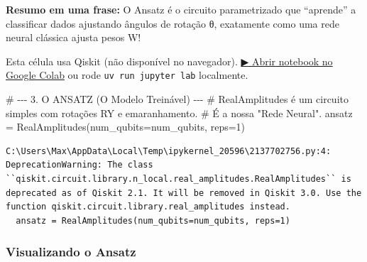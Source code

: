 \documentclass[
  brazilian,
]{report}
\newenvironment{Shaded}{\begin{snugshade}}{\end{snugshade}}
\newcommand{\CommentTok}[1]{\textcolor[rgb]{0.37,0.37,0.37}{#1}}
\newcommand{\DecValTok}[1]{\textcolor[rgb]{0.68,0.00,0.00}{#1}}
\newcommand{\NormalTok}[1]{\textcolor[rgb]{0.00,0.23,0.31}{#1}}
\newcommand{\OperatorTok}[1]{\textcolor[rgb]{0.37,0.37,0.37}{#1}}
\begin{document}
\textbf{Resumo em uma frase:} O Ansatz é o circuito parametrizado que
``aprende'' a classificar dados ajustando ângulos de rotação θ,
exatamente como uma rede neural clássica ajusta pesos W!

\begin{tcolorbox}[enhanced jigsaw, arc=.35mm, bottomrule=.15mm, bottomtitle=1mm, breakable, colback=white, colbacktitle=quarto-callout-warning-color!10!white, colframe=quarto-callout-warning-color-frame, coltitle=black, left=2mm, leftrule=.75mm, opacityback=0, opacitybacktitle=0.6, rightrule=.15mm, title=\textcolor{quarto-callout-warning-color}{\faExclamationTriangle}\hspace{0.5em}{⚛️ Célula Qiskit --- execute no Colab ou localmente}, titlerule=0mm, toprule=.15mm, toptitle=1mm]

Esta célula usa Qiskit (não disponível no navegador).
\href{https://colab.research.google.com/github/maxwellamaral/aula-quantum/blob/main/notebooks/20-quantum-machine-learning.ipynb}{▶
Abrir notebook no Google Colab} ou rode \texttt{uv\ run\ jupyter\ lab}
localmente.

\begin{Shaded}
\begin{Highlighting}[]


\CommentTok{\# {-}{-}{-} 3. O ANSATZ (O Modelo Treinável) {-}{-}{-}}
\CommentTok{\# RealAmplitudes é um circuito simples com rotações RY e emaranhamento.}
\CommentTok{\# É a nossa "Rede Neural".}
\NormalTok{ansatz }\OperatorTok{=}\NormalTok{ RealAmplitudes(num\_qubits}\OperatorTok{=}\NormalTok{num\_qubits, reps}\OperatorTok{=}\DecValTok{1}\NormalTok{)}
\end{Highlighting}
\end{Shaded}

\end{tcolorbox}

\begin{verbatim}
C:\Users\Max\AppData\Local\Temp\ipykernel_20596\2137702756.py:4: DeprecationWarning: The class ``qiskit.circuit.library.n_local.real_amplitudes.RealAmplitudes`` is deprecated as of Qiskit 2.1. It will be removed in Qiskit 3.0. Use the function qiskit.circuit.library.real_amplitudes instead.
  ansatz = RealAmplitudes(num_qubits=num_qubits, reps=1)
\end{verbatim}

\subsubsection{Visualizando o Ansatz}\label{visualizando-o-ansatz}
\end{document}
